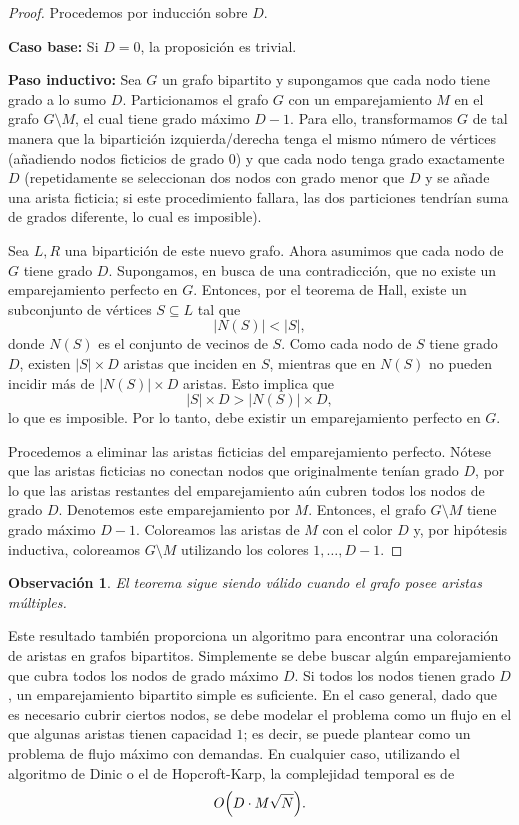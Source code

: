 \documentclass[a4paper]{article}
\newtheorem*{remark}{Observación}
\begin{document}
\begin{proof}
Procedemos por inducción sobre $D$.

\textbf{Caso base:} Si $D=0$, la proposición es trivial.

\textbf{Paso inductivo:} Sea $G$ un grafo bipartito y supongamos que cada nodo tiene grado a lo sumo $D$. Particionamos el grafo $G$ con un emparejamiento $M$ en el grafo $G\setminus M$, el cual tiene grado máximo $D-1$. Para ello, transformamos $G$ de tal manera que la bipartición izquierda/derecha tenga el mismo número de vértices (añadiendo nodos ficticios de grado $0$) y que cada nodo tenga grado exactamente $D$ (repetidamente se seleccionan dos nodos con grado menor que $D$ y se añade una arista ficticia; si este procedimiento fallara, las dos particiones tendrían suma de grados diferente, lo cual es imposible).

Sea $L,R$ una bipartición de este nuevo grafo. Ahora asumimos que cada nodo de $G$ tiene grado $D$. Supongamos, en busca de una contradicción, que no existe un emparejamiento perfecto en $G$. Entonces, por el teorema de Hall, existe un subconjunto de vértices $S\subseteq L$ tal que
\[
|N(S)| < |S|,
\]
donde $N(S)$ es el conjunto de vecinos de $S$. Como cada nodo de $S$ tiene grado $D$, existen $|S|\times D$ aristas que inciden en $S$, mientras que en $N(S)$ no pueden incidir más de $|N(S)|\times D$ aristas. Esto implica que
\[
|S|\times D > |N(S)|\times D,
\]
lo que es imposible. Por lo tanto, debe existir un emparejamiento perfecto en $G$.

Procedemos a eliminar las aristas ficticias del emparejamiento perfecto. Nótese que las aristas ficticias no conectan nodos que originalmente tenían grado $D$, por lo que las aristas restantes del emparejamiento aún cubren todos los nodos de grado $D$. Denotemos este emparejamiento por $M$. Entonces, el grafo $G\setminus M$ tiene grado máximo $D-1$. Coloreamos las aristas de $M$ con el color $D$ y, por hipótesis inductiva, coloreamos $G\setminus M$ utilizando los colores $1,\dots, D-1$.
\end{proof}

\begin{remark}
El teorema sigue siendo válido cuando el grafo posee aristas múltiples.
\end{remark}

Este resultado también proporciona un algoritmo para encontrar una coloración de aristas en grafos bipartitos. Simplemente se debe buscar algún emparejamiento que cubra todos los nodos de grado máximo $D$. Si todos los nodos tienen grado $D$, un emparejamiento bipartito simple es suficiente. En el caso general, dado que es necesario cubrir ciertos nodos, se debe modelar el problema como un flujo en el que algunas aristas tienen capacidad $1$; es decir, se puede plantear como un problema de flujo máximo con demandas. En cualquier caso, utilizando el algoritmo de Dinic o el de Hopcroft-Karp, la complejidad temporal es de
\[
O\Bigl(D\cdot M \sqrt{N}\Bigr).
\]
\end{document}
